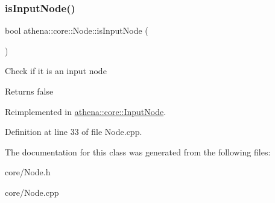 \subsubsection{\texorpdfstring{is\+Input\+Node()}{isInputNode()}}
{\footnotesize\ttfamily bool athena\+::core\+::\+Node\+::is\+Input\+Node (\begin{DoxyParamCaption}{ }\end{DoxyParamCaption})\hspace{0.3cm}{\ttfamily [virtual]}}

Check if it is an input node \begin{DoxyReturn}{Returns}
false 
\end{DoxyReturn}


Reimplemented in \mbox{\hyperlink{classathena_1_1core_1_1_input_node_a2548b569a336b75c0005295833052979}{athena\+::core\+::\+Input\+Node}}.



Definition at line 33 of file Node.\+cpp.



The documentation for this class was generated from the following files\+:\begin{DoxyCompactItemize}
\item 
core/Node.\+h\item 
core/Node.\+cpp\end{DoxyCompactItemize}
